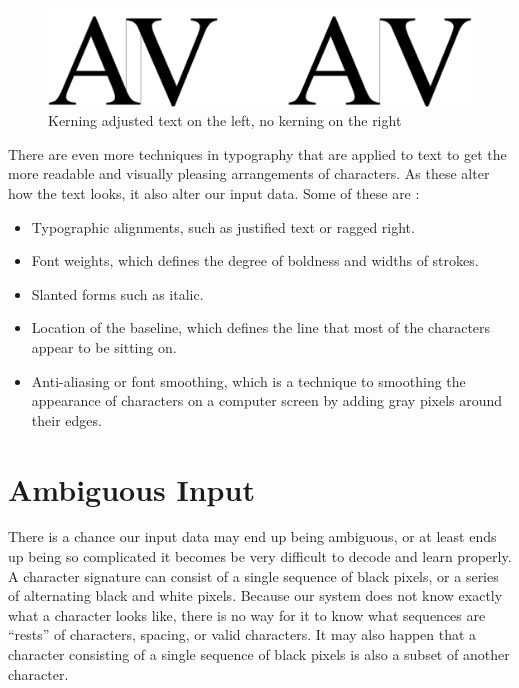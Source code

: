 \begin{figure}[ht]
    \centering
    \includegraphics[width=1.0\textwidth]{fig/chapter2/kerning.png}
    \caption{Kerning adjusted text on the left, no kerning on the right}
    \label{fig:kerning-comparison}
\end{figure}

\newpage
There are even more techniques in typography that are applied to text to get the more readable and visually pleasing arrangements of characters. As these alter how the text looks, it also alter our input data. Some of these are \citep{felici2011complete}:

\begin{itemize}
    \item Typographic alignments, such as justified text or ragged right.
    \item Font weights, which defines the degree of boldness and widths of strokes.
    \item Slanted forms such as italic.
    \item Location of the baseline, which defines the line that most of the characters appear to be sitting on.
    \item Anti-aliasing or font smoothing, which is a technique to smoothing the appearance of characters on a computer screen by adding gray pixels around their edges.
\end{itemize}


\section{Ambiguous Input}
\label{sec:ambiguous_input}
There is a chance our input data may end up being ambiguous, or at least ends up being so complicated it becomes be very difficult to decode and learn properly. A character signature can consist of a single sequence of black pixels, or a series of alternating black and white pixels. Because our system does not know exactly what a character looks like, there is no way for it to know what sequences are ``rests'' of characters, spacing, or valid characters. It may also happen that a character consisting of a single sequence of black pixels is also a subset of another character. 


